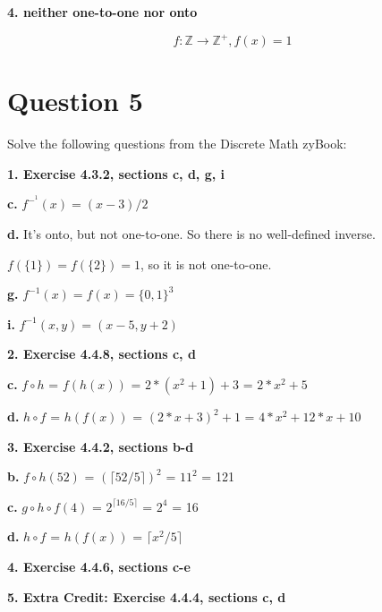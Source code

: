 \documentclass[11pt]{article}
\begin{document}
	\textbf{4. neither one-to-one nor onto}
	
	\begin{equation*}
	    f\colon\mathbb{Z}\rightarrow\mathbb{Z^+}, f(x) = 1
	\end{equation*}
	
	\newpage
	\section*{Question 5}
	
	Solve the following questions from the Discrete Math zyBook:
	
	\textbf{1. Exercise 4.3.2, sections c, d, g, i}
	
	\textbf{c.}
	$f^-^1(x)=(x-3)/2$
	
	\textbf{d.}
	It's onto, but not one-to-one. So there is no well-defined inverse.
	
	$f(\{1\})=f(\{2\})=1$, so it is not one-to-one.
	
	\textbf{g.}
	$f^{-1}(x)=f(x)=\{0,1\}^3$
	
	\textbf{i.}
	$f^{-1}(x,y)=(x-5,y+2)$
	
	\vspace{10mm}
	\textbf{2. Exercise 4.4.8, sections c, d}
	
	\textbf{c.}
	$f\circ h$ = $f(h(x))$ = $2*(x^2+1)+3$ = $2*x^2+5$
	
	\textbf{d.}
	$h\circ f$ = $h(f(x))$ = $(2*x+3)^2+1$ = $4*x^2+12*x+10$
	
	\vspace{10mm}
	\textbf{3. Exercise 4.4.2, sections b-d}
	
	\textbf{b.}
	$f\circ h(52)$ = $(\lceil 52/5\rceil)^2$ = $11^2$ = 121
	
	\textbf{c.}
	$g\circ h\circ f(4)$ = $2^{\lceil 16/5\rceil}$ = $2^4$ = 16
	
	\textbf{d.}
	$h\circ f$ = $h(f(x))$ = $\lceil x^2/5\rceil$
	
	\vspace{10mm}
	\textbf{4. Exercise 4.4.6, sections c-e}
	
	
	
	\vspace{10mm}
	\textbf{5. Extra Credit: Exercise 4.4.4, sections c, d}
	
\end{document}
